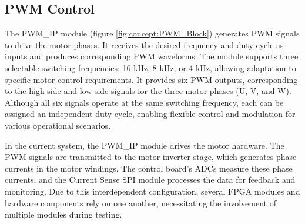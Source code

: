 	
\subsection{\acs{PWM} Control}
\label{sec:Conecpt:UnderstandingDUTs:PWM_Control}
	
	The \acs{PWM}\_IP module (figure \ref{fig:concept:PWM_Block}) generates \acs{PWM} signals to drive the motor phases. It receives the desired frequency and duty cycle as inputs and produces corresponding \acs{PWM} waveforms. The module supports three selectable switching frequencies: 16 kHz, 8 kHz, or 4 kHz, allowing adaptation to specific motor control requirements. It provides six \acs{PWM} outputs, corresponding to the high-side and low-side signals for the three motor phases (U, V, and W). Although all six signals operate at the same switching frequency, each can be assigned an independent duty cycle, enabling flexible control and modulation for various operational scenarios.
	
	In the current system, the \acs{PWM}\_IP module drives the motor hardware. The \acs{PWM} signals are transmitted to the motor inverter stage, which generates phase currents in the motor windings. The control board’s \acs{ADC}s measure these phase currents, and the Current Sense \acs{SPI} module processes the data for feedback and monitoring. Due to this interdependent configuration, several \acs{FPGA} modules and hardware components rely on one another, necessitating the involvement of multiple modules during testing.
	
